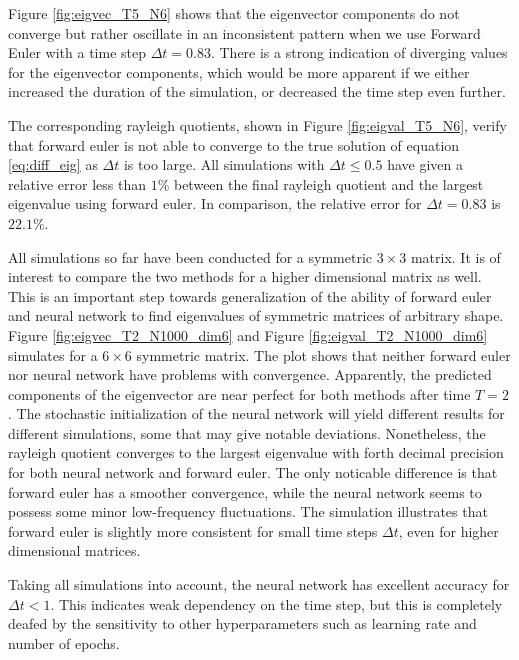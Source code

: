 \documentclass[12pt]{extarticle}
\begin{document}
Figure \ref{fig:eigvec_T5_N6} shows that the eigenvector components do not converge but rather oscillate in an inconsistent pattern when we use Forward Euler with a time step $\Delta t =0.83$. There is a strong indication of diverging values for the eigenvector components, which would be more apparent if we either increased the duration of the simulation, or decreased the time step even further. 

The corresponding rayleigh quotients, shown in Figure \ref{fig:eigval_T5_N6}, verify that forward euler is not able to converge to the true solution of equation \eqref{eq:diff_eig} as $\Delta t$ is too large. All simulations with $\Delta t \leq 0.5$ have given a relative error less than $1\%$ between the final rayleigh quotient and the largest eigenvalue using forward euler. In comparison, the relative error for $\Delta t = 0.83$ is $22.1\%$.
 
All simulations so far have been conducted for a symmetric $3\times 3$ matrix. It is of interest to compare the two methods for a higher dimensional matrix as well. This is an important step towards generalization of the ability of forward euler and neural network to find eigenvalues of symmetric matrices of arbitrary shape. Figure \ref{fig:eigvec_T2_N1000_dim6} and Figure \ref{fig:eigval_T2_N1000_dim6} simulates for a $6\times 6$ symmetric matrix. The plot shows that neither forward euler nor neural network have problems with convergence. Apparently, the predicted components of the eigenvector are near perfect for both methods after time $T=2$. The stochastic initialization of the neural network will yield different results for different simulations, some that may give notable deviations. Nonetheless, the rayleigh quotient converges to the largest eigenvalue with forth decimal precision for both neural network and forward euler. The only noticable difference is that forward euler has a smoother convergence, while the neural network seems to possess some minor low-frequency fluctuations. The simulation illustrates that forward euler is slightly more consistent for small time steps $\Delta t$, even for higher dimensional matrices.

Taking all simulations into account, the neural network has excellent accuracy for $\Delta t < 1$. This indicates weak dependency on the time step, but this is completely deafed by the sensitivity to other hyperparameters such as learning rate and number of epochs.
\end{document}
